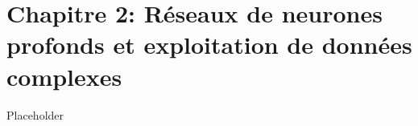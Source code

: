 \chapter*{Chapitre 2: Réseaux de neurones profonds et exploitation de données complexes}
Placeholder